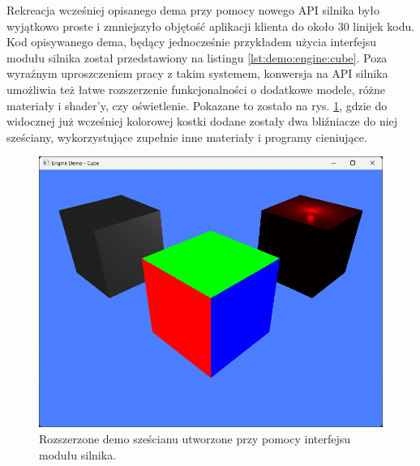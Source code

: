 Rekreacja wcześniej opisanego dema przy pomocy nowego API silnika było wyjątkowo proste i zmniejszyło objętość aplikacji klienta do około 30 linijek kodu. Kod opisywanego dema, będący jednocześnie przykładem użycia interfejsu modułu silnika został przedstawiony na listingu \ref{lst:demo:engine:cube}. Poza wyraźnym uproszczeniem pracy z takim systemem, konwersja na API silnika umożliwia też łatwe rozszerzenie funkcjonalności o dodatkowe modele, różne materiały i shader'y, czy oświetlenie. Pokazane to zostało na rys. \ref{demo_engine_cube}, gdzie do widocznej już wcześniej kolorowej kostki dodane zostały dwa bliźniacze do niej sześciany, wykorzystujące zupełnie inne materiały i programy cieniujące.

\begin{figure}[h!]
	\centering
	\includegraphics[width=\textwidth]{images/demo_engine_cube.png}
	\caption{Rozszerzone demo sześcianu utworzone przy pomocy interfejsu modułu silnika.}
	\label{demo_engine_cube}
\end{figure}

\vfill

